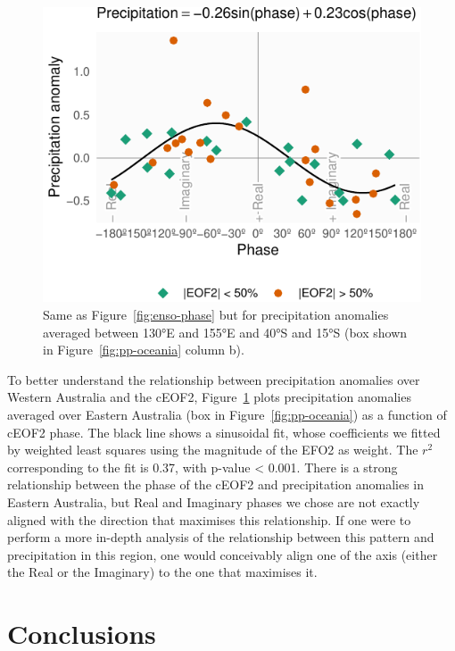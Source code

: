 \documentclass[smallextended]{svjour3}       %
\begin{document}
\begin{figure}
\centering
\includegraphics{../figures/australia-pp-phase-1.pdf}
\caption{\label{fig:australia-pp-phase}Same as Figure~\ref{fig:enso-phase} but for precipitation anomalies averaged between 130°E and 155°E and 40°S and 15°S (box shown in Figure~\ref{fig:pp-oceania} column b).}
\end{figure}

To better understand the relationship between precipitation anomalies over Western Australia and the cEOF2, Figure~\ref{fig:australia-pp-phase} plots precipitation anomalies averaged over Eastern Australia (box in Figure~\ref{fig:pp-oceania}) as a function of cEOF2 phase. The black line shows a sinusoidal fit, whose coefficients we fitted by weighted least squares using the magnitude of the EFO2 as weight. The \(r^2\) corresponding to the fit is 0.37, with p-value \textless{} 0.001. There is a strong relationship between the phase of the cEOF2 and precipitation anomalies in Eastern Australia, but Real and Imaginary phases we chose are not exactly aligned with the direction that maximises this relationship. If one were to perform a more in-depth analysis of the relationship between this pattern and precipitation in this region, one would conceivably align one of the axis (either the Real or the Imaginary) to the one that maximises it.



\hypertarget{conclusions}{%
\section{Conclusions}\label{conclusions}}
\end{document}
